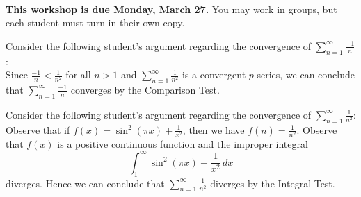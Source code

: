 \documentclass[letterpaper,11pt]{examPTP}
\begin{document}
\pagestyle{headandfoot}


\noindent \underline{\hspace{6.5in}}


\begin{center}
\addpoints
\gradetable[h]  
\end{center}
\workshopinstructionsb
\\
{\bf This workshop is due Monday, March 27.} You may work in groups, but each student must turn in their own copy.  

\begin{questions}
\question Consider the following student's argument regarding the convergence of $\sum\limits_{n=1}^{\infty} \frac{-1}{n}$:\\
Since $\frac{-1}{n} < \frac{1}{n^2}$ for all $n>1$ and $\sum\limits_{n=1}^{\infty} \frac{1}{n^2}$ is a convergent $p$-series, we can conclude that $\sum\limits_{n=1}^{\infty}\frac{-1}{n}$ converges by the Comparison Test.

\question Consider the following student's argument regarding the convergence of $\sum\limits_{n=1}^{\infty} \frac{1}{n^2}$:\\
Observe that if $f(x) = \sin^2(\pi x) + \frac{1}{x^2}$, then we have $f(n) = \frac{1}{n^2}$. Observe that $f(x)$ is a positive continuous function and the improper integral
\[
\int_{1}^{\infty} \sin^{2}(\pi x) + \frac{1}{x^2} \,dx
\]
diverges. Hence we can conclude that $\sum\limits_{n=1}^{\infty} \frac{1}{n^2}$ diverges by the Integral Test.
\end{questions}
\end{document}

